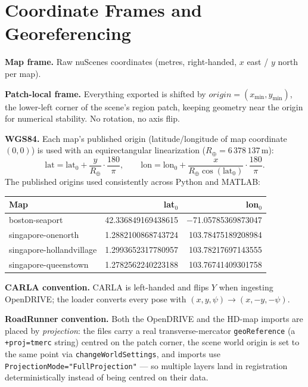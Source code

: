 \documentclass[11pt]{article}
\newcommand{\code}[1]{{\setlength{\fboxsep}{1.5pt}\colorbox{codegray}{\small\texttt{#1}}}}
\begin{document}
\section{Coordinate Frames and Georeferencing}
\label{sec:frames}

\textbf{Map frame.} Raw nuScenes coordinates (metres, right-handed, $x$ east / $y$
north per map).

\textbf{Patch-local frame.} Everything exported is shifted by
$\mathit{origin} = (x_{\min}, y_{\min})$, the lower-left corner of the scene's region
patch, keeping geometry near the origin for numerical stability. No rotation, no axis
flip.

\textbf{WGS84.} Each map's published origin (latitude/longitude of map coordinate
$(0,0)$) is used with an equirectangular linearization
($R_\oplus = 6\,378\,137$\,m):
\[
\mathrm{lat} = \mathrm{lat}_0 + \frac{y}{R_\oplus}\cdot\frac{180}{\pi},
\qquad
\mathrm{lon} = \mathrm{lon}_0 + \frac{x}{R_\oplus \cos(\mathrm{lat}_0)}\cdot\frac{180}{\pi}.
\]
The published origins used consistently across Python and MATLAB:

\begin{center}
\small
\begin{tabular}{lrr}
\toprule
\textbf{Map} & \textbf{lat$_0$} & \textbf{lon$_0$} \\
\midrule
boston-seaport            & 42.336849169438615 & $-$71.05785369873047 \\
singapore-onenorth        & 1.2882100868743724 & 103.78475189208984 \\
singapore-hollandvillage  & 1.2993652317780957 & 103.78217697143555 \\
singapore-queenstown      & 1.2782562240223188 & 103.76741409301758 \\
\bottomrule
\end{tabular}
\end{center}

\textbf{CARLA convention.} CARLA is left-handed and flips $Y$ when ingesting OpenDRIVE;
the loader converts every pose with $(x, y, \psi) \rightarrow (x, -y, -\psi)$.

\textbf{RoadRunner convention.} Both the OpenDRIVE and the HD-map imports are placed by
\emph{projection}: the files carry a real transverse-mercator \code{geoReference}
(a \code{+proj=tmerc} string) centred on the patch corner, the
scene world origin is set to the same point via \code{changeWorldSettings}, and imports
use \code{ProjectionMode="FullProjection"} --- so multiple layers land in registration
deterministically instead of being centred on their data.
\end{document}
